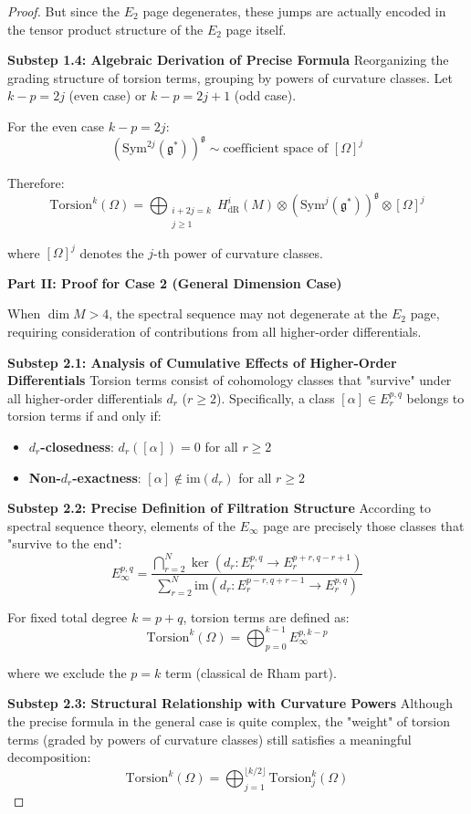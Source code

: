 \documentclass[10pt,a4paper]{amsart}
\begin{document}
\begin{proof}
But since the $E_2$ page degenerates, these jumps are actually encoded in the tensor product structure of the $E_2$ page itself.

\textbf{Substep 1.4: Algebraic Derivation of Precise Formula}
Reorganizing the grading structure of torsion terms, grouping by powers of curvature classes. Let $k-p = 2j$ (even case) or $k-p = 2j+1$ (odd case).

For the even case $k-p = 2j$:
$$(\text{Sym}^{2j}(\mathfrak{g}^*))^\mathfrak{g} \sim \text{coefficient space of }[\Omega]^j$$

Therefore:
$$\text{Torsion}^k(\Omega) = \bigoplus_{\substack{i+2j=k \\ j \geq 1}} H^i_{\text{dR}}(M) \otimes (\text{Sym}^j(\mathfrak{g}^*))^\mathfrak{g} \otimes [\Omega]^j$$

where $[\Omega]^j$ denotes the $j$-th power of curvature classes.

\textbf{Part II: Proof for Case 2 (General Dimension Case)}

When $\dim M > 4$, the spectral sequence may not degenerate at the $E_2$ page, requiring consideration of contributions from all higher-order differentials.

\textbf{Substep 2.1: Analysis of Cumulative Effects of Higher-Order Differentials}
Torsion terms consist of cohomology classes that "survive" under all higher-order differentials $d_r$ ($r \geq 2$). Specifically, a class $[\alpha] \in E_r^{p,q}$ belongs to torsion terms if and only if:
\begin{itemize}
\item \textbf{$d_r$-closedness}: $d_r([\alpha]) = 0$ for all $r \geq 2$
\item \textbf{Non-$d_r$-exactness}: $[\alpha] \notin \text{im}(d_r)$ for all $r \geq 2$
\end{itemize}

\textbf{Substep 2.2: Precise Definition of Filtration Structure}
According to spectral sequence theory, elements of the $E_\infty$ page are precisely those classes that "survive to the end":
$$E_\infty^{p,q} = \frac{\bigcap_{r=2}^N \ker(d_r: E_r^{p,q} \to E_r^{p+r,q-r+1})}{\sum_{r=2}^N \text{im}(d_r: E_r^{p-r,q+r-1} \to E_r^{p,q})}$$

For fixed total degree $k = p+q$, torsion terms are defined as:
$$\text{Torsion}^k(\Omega) = \bigoplus_{p=0}^{k-1} E_\infty^{p,k-p}$$

where we exclude the $p = k$ term (classical de Rham part).

\textbf{Substep 2.3: Structural Relationship with Curvature Powers}
Although the precise formula in the general case is quite complex, the "weight" of torsion terms (graded by powers of curvature classes) still satisfies a meaningful decomposition:
$$\text{Torsion}^k(\Omega) = \bigoplus_{j=1}^{\lfloor k/2 \rfloor} \text{Torsion}^k_j(\Omega)$$


\end{proof}
\end{document}
